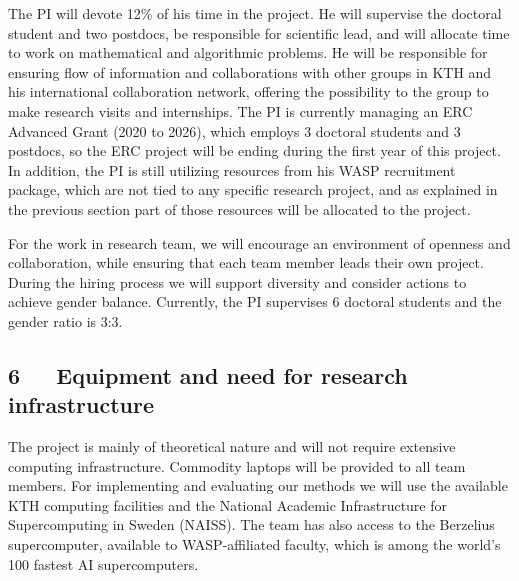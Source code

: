 \documentclass[a4paper,11pt]{article}
\begin{document}
The PI will devote 12\% of his time in the project. 
He will supervise the doctoral student and two postdocs, 
be responsible for scientific lead, 
and will allocate time to work on mathematical and algorithmic problems.
He will be responsible for ensuring flow of information and collaborations
with other groups in KTH and his international collaboration network, 
offering the possibility to the group to make research visits and internships.
The PI is currently managing an ERC Advanced Grant (2020 to 2026),
which employs 3 doctoral students and 3 postdocs, 
so the ERC project will be ending during the first year of this project. 
In addition, the PI is still utilizing resources from his WASP recruitment package, 
which are not tied to any specific research project, 
and as explained in the previous section part of those resources will be allocated to the {\acronym} project.

For the work in research team, 
we will encourage an environment of openness and collaboration, 
while ensuring that each team member leads their own project.
%
During the hiring process we will support diversity and consider actions to achieve gender balance. 
Currently, the PI supervises 6 doctoral students and the gender ratio is 3:3.




\subsection*{6~~~Equipment and need for research infrastructure}


The project is mainly of theoretical nature and will not require extensive computing infrastructure. 
Commodity laptops will be provided to all team members. 
For implementing and evaluating our methods we will use the available 
KTH computing facilities
and the National Academic Infrastructure for Supercomputing in Sweden (NAISS).
The team has also access to the Berzelius supercomputer, 
available to WASP-affiliated faculty, 
which is among the world's 100 fastest AI supercomputers.
\end{document}
